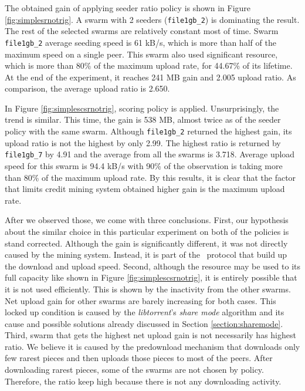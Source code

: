The obtained gain of applying seeder ratio policy is shown in Figure \ref{fig:simplesrnotrig}. A swarm with 2 seeders (\texttt{file1gb\_2}) is dominating the result. The rest of the selected swarms are relatively constant most of time. Swarm \texttt{file1gb\_2} average seeding speed is 61 kB/s, which is more than half of the maximum speed on a single peer. This swarm also used significant resource, which is more than 80\% of the maximum upload rate, for 44.67\% of its lifetime. At the end of the experiment, it reaches 241 MB gain and 2.005 upload ratio. As comparison, the average upload ratio is 2.650.

In Figure \ref{fig:simplescsrnotrig}, scoring policy is applied. Unsurprisingly, the trend is similar. This time, the gain is 538 MB, almost twice as of the seeder policy with the same swarm.  Although \texttt{file1gb\_2} returned the highest gain, its upload ratio is not the highest by only 2.99.  The highest ratio is returned by \texttt{file1gb\_7} by 4.91 and the average from all the swarms is 3.718. Average upload speed for this swarm is 94.4 kB/s with 90\% of the observation is taking more than 80\% of the maximum upload rate. By this results, it is clear that the factor that limits credit mining system obtained higher gain is the maximum upload rate. 

After we observed those, we come with three conclusions. First, our hypothesis about the similar choice in this particular experiment on both of the policies is stand corrected. Although the gain is significantly different, it was not directly caused by the mining system. Instead, it is part of the \bt~protocol that build up the download and upload speed. Second, although the resource may be used to its full capacity like shown in Figure \ref{fig:simplescsrnotrig}, it is entirely possible that it is not used efficiently. This is shown by the inactivity from the other swarms. Net upload gain for other swarms are barely increasing for both cases. This locked up condition is caused by the \textit{libtorrent}'s \textit{share mode} algorithm and its cause and possible solutions already discussed in Section \ref{section:sharemode}. Third, swarm that gets the highest net upload gain is not necessarily has highest ratio. We believe it is caused by the predownload mechanism that downloads only few rarest pieces and then uploads those pieces to most of the peers. After downloading rarest pieces, some of the swarms are not chosen by policy. Therefore, the ratio keep high because there is not any downloading activity.

